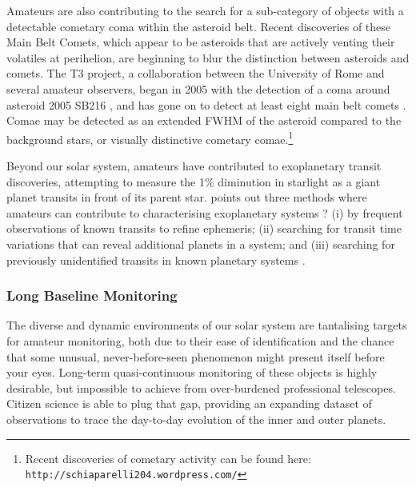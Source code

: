 \documentclass{ar2e}
\begin{document}
Amateurs are also contributing to the search for a sub-category of objects
with a detectable cometary coma within the asteroid belt.  Recent discoveries
of these Main Belt Comets, which appear to be asteroids that are actively
venting their volatiles at perihelion, are beginning to blur the distinction
between asteroids and comets.  The T3 project, a collaboration between the
University of Rome and several amateur observers, began in 2005 with the
detection of a coma around asteroid 2005 SB216 \citep{05buzzi}, and has gone
on to detect at least eight main belt comets \citep{13mousis}. Comae may be
detected as an extended FWHM of the asteroid compared to the background stars,
or visually distinctive cometary comae.\footnote{Recent discoveries of cometary
activity can be found here: \texttt{http://schiaparelli204.wordpress.com/}}

Beyond our solar system, amateurs have contributed to exoplanetary transit
discoveries,  attempting to measure the 1\% diminution in starlight as a giant
planet transits in front of its parent star. \citet{13mousis} points out three
methods where amateurs can contribute to characterising exoplanetary systems ?
(i) by frequent observations of known transits to refine ephemeris; (ii)
searching for transit time variations that can reveal additional planets in a
system; and (iii) searching for previously unidentified transits in known
planetary systems \citep[e.g., the discovery of the transit of HD 80606b from
a 30 cm telescope near London,][]{09fossey}.




 
 

\subsubsection{Long Baseline Monitoring}

The diverse and dynamic environments of our solar system are tantalising targets
for amateur monitoring, both due to their ease of identification and the chance
that some unusual, never-before-seen phenomenon might present itself before your
eyes.  Long-term quasi-continuous monitoring of these objects is highly
desirable, but impossible to achieve from over-burdened professional
telescopes.  Citizen science is able to plug that gap, providing an expanding
dataset of observations to trace the day-to-day evolution of the inner and outer
planets.
\end{document}
